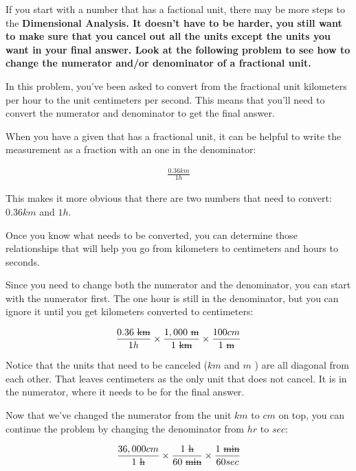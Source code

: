 \begin{example}
  If you start with a number that has a
  factional unit, there may be more steps to the \bf{Dimensional Analysis}.
  It doesn't have to be harder, you still want to make sure that you cancel out
  all the units except the units you want in your final answer. Look at the
  following problem to see how to change the numerator and/or denominator of a
  fractional unit.

  In this problem, you've been asked to convert from the fractional unit
  kilometers per hour to the unit centimeters per second. This means that
  you'll need to convert the numerator and denominator to get the final answer.

  When you have a given that has a fractional unit, it can be helpful to write
  the measurement as a fraction with an one in the denominator:

  \begin{align}
    \frac{0.36 km}{1 h}
  \end{align}

  This makes it more obvious that there are two numbers that need to convert:
  $0.36 km$ and $1 h$.

  Once you know what needs to be converted, you can determine those
  relationships that will help you go from kilometers to centimeters and hours
  to seconds.

  Since you need to change both the numerator and the denominator, you can
  start with the numerator first. The one hour is still in the denominator, but
  you can ignore it until you get kilometers converted to centimeters:

  \begin{align}
    \frac{0.36 \rm{ \sout{km}}}{1 h} \times
    \frac{1,000 \rm{ \sout{m}}}{1 \rm{ \sout{km}}}
    \times \frac{100 cm}{1 \rm{ \sout{m}}}
  \end{align}

  Notice that the units that need to be canceled ($km$ and $m$ ) are all
  diagonal from each other. That leaves centimeters as the only unit that does
  not cancel. It is in the numerator, where it needs to be for the final
  answer.

  Now that we've changed the numerator from the unit $km$ to $cm$ on top, you
  can continue the problem by changing the denominator from $hr$ to $sec$:

  \begin{align}
    \frac{36,000 cm}{1 \rm{ \sout{h}}} \times \frac{1 \rm{ \sout{h}}}{60 \rm{ \sout{min}}} \times \frac{1 \rm{ \sout{min}}}{60 sec}
  \end{align}


\end{example}
